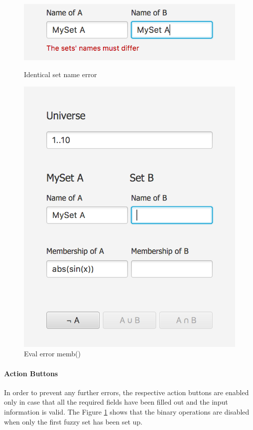 \documentclass[12pt,a4paper,titlepage,final]{article}
\begin{document}
\begin{figure}[!htb]
  \includegraphics[width=\linewidth]{img/set-name-error}
  \caption{Identical set name error} \label{fig:setNameError}
\endminipage\hfill
{}
  \includegraphics[width=\linewidth]{img/buttons-disabled}
  \caption{Eval error memb()}\label{fig:disabledButtons}
\endminipage
\end{figure}

\paragraph{Action Buttons}
In order to prevent any further errors, the respective action buttons are enabled only in case that all the required fields have been filled out and the input information is valid. The Figure \ref{fig:disabledButtons} shows that the binary operations are disabled when only the first fuzzy set has been set up.
\end{document}
